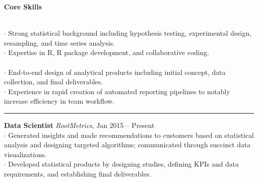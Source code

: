\documentclass[letterpaper, onecolumn, oneside]{article}
\newcommand{\dotindent}{\hspace*{.25in}$\cdot$ }
\newcommand{\spaceindent}{\hspace*{0.25in}}
\begin{document}
\begin{flushleft}


\textbf{\large Core Skills}
\vspace*{0.05in}

\spaceindent {\bf Statistics and Analysis} \\
\dotindent Strong statistical background including hypothesis testing, experimental design, resampling, and time series analysis. \\
\dotindent Expertise in R, R package development, and collaborative coding. %
~\\

\spaceindent {\bf Analytical Product Development} \\
\dotindent End-to-end design of analytical products including initial concept, data collection, and final deliverables. \\
\dotindent Experience in rapid creation of automated reporting pipelines to notably increase efficiency in team workflow.   \\

\textcolor{litegrey}{\rule{\textwidth}{.1pt}}


\vspace*{0.1in}



\textbf{\large Data Scientist} \emph{RootMetrics}, Jan 2015 -- Present \\
\dotindent Generated insights and made recommendations to customers based on statistical analysis and designing targeted algorithms; communicated through succinct data visualizations.  \\
\dotindent Developed statistical products by designing studies, defining KPIs and data requirements, and establishing final deliverables.  \\
~\\


\end{flushleft}
\end{document}
